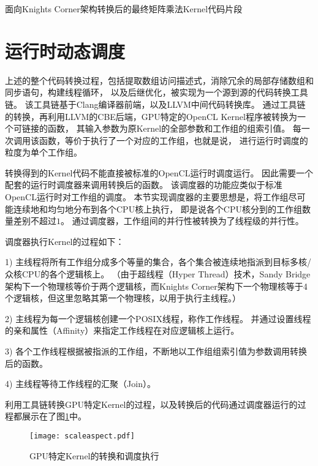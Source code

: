 \begin{table}[htb]
\centering
\caption{面向Knights Corner架构转换后的最终矩阵乘法Kernel代码片段}
\label{micouput}
\end{table}


\section{运行时动态调度}
\label{runtimesec}
上述的整个代码转换过程，包括提取数组访问描述式，消除冗余的局部存储数组和同步语句，构建线程循环，
以及后继优化，被实现为一个源到源的代码转换工具链。
该工具链基于Clang编译器前端，以及LLVM中间代码转换库。
通过工具链的转换，再利用LLVM的CBE后端，GPU特定的OpenCL Kernel程序被转换为一个可链接的函数，
其输入参数为原Kernel的全部参数和工作组的组索引值。
每一次调用该函数，等价于执行了一个对应的工作组，也就是说，
进行运行时调度的粒度为单个工作组。

转换得到的Kernel代码不能直接被标准的OpenCL运行时调度运行。
因此需要一个配套的运行时调度器来调用转换后的函数。
该调度器的功能应类似于标准OpenCL运行时对工作组的调度。
本节实现调度器的主要思想是，将工作组尽可能连续地和均匀地分布到各个CPU核上执行，
即是说各个CPU核分到的工作组数量差别不超过$1$。
通过调度器，工作组间的并行性被转换为了线程级的并行性。

调度器执行Kernel的过程如下：
\begin{compactitem}
\item[1)]{主线程将所有工作组分成多个等量的集合，各个集合被连续地指派到目标多核/众核CPU的各个逻辑核上。
（由于超线程（Hyper Thread）技术，Sandy Bridge架构下一个物理核等价于两个逻辑核，而Knights Corner架构下一个物理核等于4个逻辑核，但这里忽略其第一个物理核，以用于执行主线程。）}
\item[2)]{主线程为每一个逻辑核创建一个POSIX线程，称作工作线程。
并通过设置线程的亲和属性（Affinity）来指定工作线程在对应逻辑核上运行。}
\item[3)]{各个工作线程根据被指派的工作组，不断地以工作组组索引值为参数调用转换后的函数。}
\item[4)]{主线程等待工作线程的汇聚（Join）。}
\end{compactitem}

利用工具链转换GPU特定Kernel的过程，以及转换后的代码通过调度器运行的过程都展示在了图\ref{sysdiagram}中。

\begin{figure}[htb]
	\centering
	\texttt{[image: scaleaspect.pdf]}
	\caption{GPU特定Kernel的转换和调度执行}
	\label{sysdiagram}
\end{figure}

